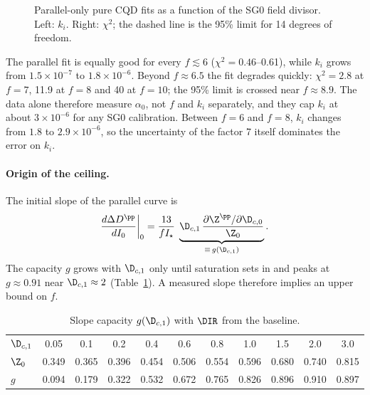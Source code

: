 \begin{figure}[h]
\centering
{}
\caption{Parallel-only pure CQD fits as a function of the SG0 field divisor. Left: $k_i$. Right:
$\chi^2$; the dashed line is the 95\% limit for 14 degrees of freedom.}
\label{fig:fscan}
\end{figure}

The parallel fit is equally good for every $f\lesssim6$ ($\chi^2=0.46$--0.61), while $k_i$ grows from
$1.5\times10^{-7}$ to $1.8\times10^{-6}$. Beyond $f\approx6.5$ the fit degrades quickly:
$\chi^2=2.8$ at $f=7$, 11.9 at $f=8$ and 40 at $f=10$; the 95\% limit is crossed near $f\approx8.9$.
The data alone therefore measure $\alpha_0$, not $f$ and $k_i$ separately, and they cap $k_i$ at about
$3\times10^{-6}$ for any SG0 calibration. Between $f=6$ and $f=8$, $k_i$ changes from $1.8$ to
$2.9\times10^{-6}$, so the uncertainty of the factor 7 itself dominates the error on $k_i$.

\paragraph{Origin of the ceiling.} The initial slope of the parallel curve is
\begin{equation}
\frac{d\Delta D^\pp}{dI_0}\bigg|_0=\frac{13}{fI_\star}\;
\underbrace{\D_{c,1}\,\frac{\partial\Z^\pp/\partial\D_{c,0}}{\Z_0}}_{\equiv\,g(\D_{c,1})}.
\end{equation}
The capacity $g$ grows with $\D_{c,1}$ only until saturation sets in and peaks at $g\approx0.91$ near
$\D_{c,1}\approx2$ (Table~\ref{tab:g}). A measured slope therefore implies an upper bound on $f$.

\begin{table}[h]
\centering
\caption{Slope capacity $g(\D_{c,1})$ with $\DIR$ from the baseline.}
\label{tab:g}
\small\setlength{\tabcolsep}{4pt}
\begin{tabular}{lcccccccccc}
\toprule
$\D_{c,1}$ & 0.05 & 0.1 & 0.2 & 0.4 & 0.6 & 0.8 & 1.0 & 1.5 & 2.0 & 3.0\\
$\Z_0$ & 0.349 & 0.365 & 0.396 & 0.454 & 0.506 & 0.554 & 0.596 & 0.680 & 0.740 & 0.815\\
$g$ & 0.094 & 0.179 & 0.322 & 0.532 & 0.672 & 0.765 & 0.826 & 0.896 & 0.910 & 0.897\\
\bottomrule
\end{tabular}
\end{table}

